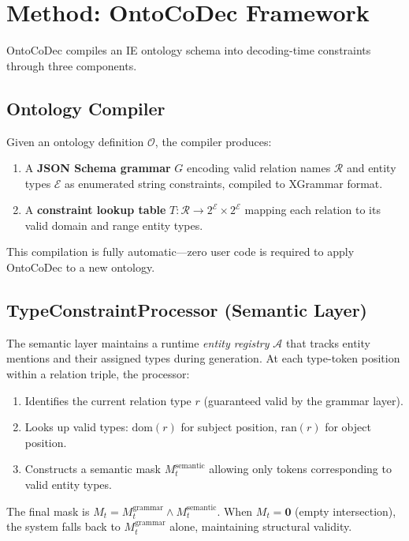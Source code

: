 \documentclass[11pt,a4paper]{article}
\newcommand{\system}{OntoCoDec}
\begin{document}
\section{Method: \system{} Framework}

\system{} compiles an IE ontology schema into decoding-time constraints through three components.

\subsection{Ontology Compiler}

Given an ontology definition $\mathcal{O}$, the compiler produces:
\begin{enumerate}
    \item A \textbf{JSON Schema grammar} $G$ encoding valid relation names $\mathcal{R}$ and entity types $\mathcal{E}$ as enumerated string constraints, compiled to XGrammar format.
    \item A \textbf{constraint lookup table} $T: \mathcal{R} \to 2^{\mathcal{E}} \times 2^{\mathcal{E}}$ mapping each relation to its valid domain and range entity types.
\end{enumerate}
This compilation is fully automatic---zero user code is required to apply \system{} to a new ontology.

\subsection{TypeConstraintProcessor (Semantic Layer)}

The semantic layer maintains a runtime \emph{entity registry} $\mathcal{A}$ that tracks entity mentions and their assigned types during generation. At each type-token position within a relation triple, the processor:

\begin{enumerate}
    \item Identifies the current relation type $r$ (guaranteed valid by the grammar layer).
    \item Looks up valid types: $\text{dom}(r)$ for subject position, $\text{ran}(r)$ for object position.
    \item Constructs a semantic mask $M_t^{\text{semantic}}$ allowing only tokens corresponding to valid entity types.
\end{enumerate}

The final mask is $M_t = M_t^{\text{grammar}} \wedge M_t^{\text{semantic}}$. When $M_t = \mathbf{0}$ (empty intersection), the system falls back to $M_t^{\text{grammar}}$ alone, maintaining structural validity.
\end{document}
